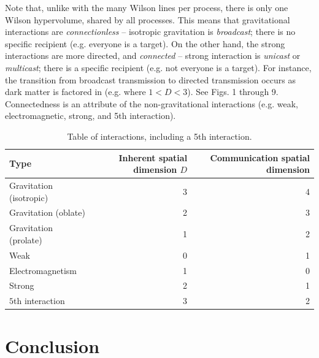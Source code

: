 \documentclass[12pt]{article}
\begin{document}
Note that, unlike with the many Wilson lines per process, there is only one Wilson hypervolume, shared by all processes.
This means that gravitational interactions are {\textit{connectionless}} -- isotropic gravitation is {\textit{broadcast}}; there is no specific recipient (e.g. everyone is a target).
On the other hand, the strong interactions are more directed, and {\textit{connected}} -- strong interaction is {\textit{unicast}} or {\textit{multicast}}; there is a specific recipient (e.g. not everyone is a target).
For instance, the transition from broadcast transmission to directed transmission occurs as dark matter is factored in (e.g. where $1 < D < 3$).
See Figs. 1 through 9.
Connectedness is an attribute of the non-gravitational interactions (e.g. weak, electromagnetic, strong, and 5th interaction).




\begin{table}
\caption{Table of interactions, including a 5th interaction.}
\begin{center}
\begin{tabular}{| l | r | r |}
  \hline
  Type & Inherent spatial dimension $D$ & Communication spatial dimension \\
\hline
\hline


Gravitation (isotropic) & 3  & 4\\

\rowcolor{Gray}
Gravitation (oblate) & 2 & 3\\

Gravitation (prolate) & 1 & 2\\

\rowcolor{Gray}
Weak & 0 & 1\\

Electromagnetism & 1 & 0 \\

\rowcolor{Gray}
Strong & 2 & 1\\

$5$th interaction & 3 & 2 \\
  \hline
\end{tabular}
\end{center}
\end{table}




\section{Conclusion}
\end{document}
